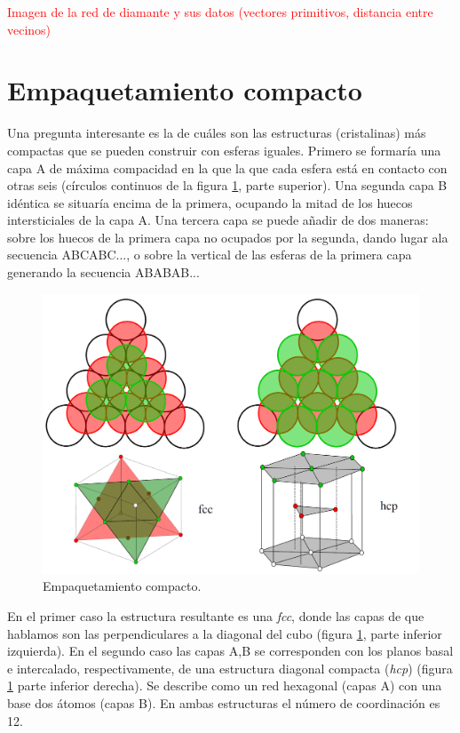 \begin{Anotacion}
	\textcolor{red}{
	Imagen de la red de diamante y sus datos (vectores primitivos, distancia entre vecinos)}
\end{Anotacion}

\section{Empaquetamiento compacto}

Una pregunta interesante es la de cuáles son las estructuras (cristalinas) más compactas que se pueden construir con esferas iguales. Primero se formaría una capa A de máxima compacidad en la que la que cada esfera está en contacto con otras seis (círculos continuos de la figura \ref{Fig:01-04}, parte superior). Una segunda capa B idéntica se situaría encima de la primera, ocupando la mitad de los huecos intersticiales de la capa A. Una tercera capa se puede añadir de dos maneras: sobre los huecos de la primera capa no ocupados por la segunda, dando lugar ala secuencia ABCABC..., o sobre la vertical de las esferas de la primera capa generando la secuencia ABABAB...

\begin{figure}[h!] \centering
    \includegraphics[scale=0.2]{Cuerpo/Ch_01/Empaquetamiento_compacto.png}
    \caption{Empaquetamiento compacto.}
    \label{Fig:01-04}
\end{figure}

En el primer caso la estructura resultante es una {\it fcc}, donde las capas de que hablamos son las perpendiculares a la diagonal del cubo (figura \ref{Fig:01-04}, parte inferior izquierda). En el segundo caso las capas A,B se corresponden con los planos basal e intercalado, respectivamente, de una estructura diagonal compacta ({\it hcp}) (figura \ref{Fig:01-04} parte inferior derecha). Se describe como un red hexagonal (capas A) con una base dos átomos (capas B). En ambas estructuras el número de coordinación es 12. 

